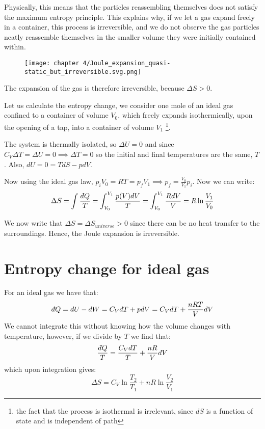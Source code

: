 \documentclass[a4paper,11pt,oneside]{book}
\newcommand{\dbar}{d\hspace*{-0.08em}\bar{}\hspace*{0.1em}}
\begin{document}
Physically, this means that the particles reassembling themselves does not satisfy the maximum entropy principle. 
This explains why, if we let a gas expand freely in a container, this process is irreversible, and we do not observe the gas particles neatly reassemble themselves in the smaller volume they were initially contained within.
 
 \begin{figure}[h!]
    \centering
    \texttt{[image: chapter 4/Joule\_expansion\_quasi-static\_but\_irreversible.svg.png]}
    \label{fig:my_label}
\end{figure}
 
 The expansion of the gas is therefore irreversible, because $\Delta S >0$. 
 
 
 Let us calculate the entropy change, we consider one mole of an ideal gas confined to a container of volume $V_0$, which freely expands  isothermically, upon the opening of a tap, into a container of volume $V_1$ \footnote{the fact that the process is isothermal is irrelevant, since $dS$ is a function of state and is independent of path}. 
 
 
 The system is thermally isolated, so $\Delta U = 0$ and since $C_V \Delta T = \Delta U = 0 \implies \Delta T = 0$ so the initial and final temperatures are the same, $T$. Also, $dU = 0 = TdS - p dV$.
 
 
Now using the ideal gas law, $p_iV_0 = RT =p_f V_1 \implies p_f = \frac{V_0}{V_1} p_i$. Now we can write:
\begin{equation}
    \Delta S = \int \frac{\dbar Q}{T} = \int_{V_0}^{V_1} \frac{p(V) dV}{T} = \int_{V_0}^{V_1} \frac{R dV}{V} = R \ln \frac{V_1}{V_0} 
\end{equation}

We now write that $\Delta S = \Delta S_{universe}>0$ since there can be no heat transfer to the surroundings. Hence, the Joule expansion is irreversible.
\section{Entropy change for ideal gas}
For an ideal gas we have that:
\begin{equation}
    \dbar Q = dU - dW = C_V dT + pdV = C_V dT + \frac{nRT}{V} dV
\end{equation}
We cannot integrate this without knowing how the volume changes with temperature, however, if we divide by $T$ we find that:
\begin{equation}
    \frac{\dbar Q}{T} = \frac{C_V dT}{T} + \frac{nR}{V} dV
\end{equation}
which upon integration gives:
\begin{equation}
    \boxed{\Delta S = C_V \ln \frac{T_2}{T_1} + nR \ln \frac{V_2}{V_1}}
\end{equation}
\end{document}
